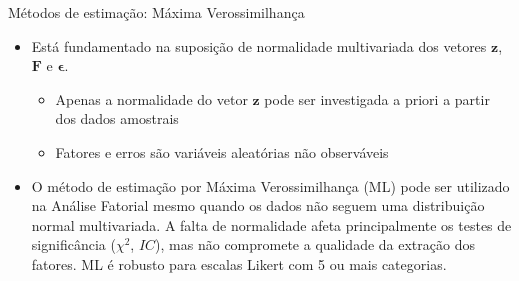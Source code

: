 \documentclass[
  ignorenonframetext,
  aspectratio=169,
]{beamer}
\providecommand{\tightlist}{%
  \setlength{\itemsep}{0pt}\setlength{\parskip}{0pt}}
\begin{document}
\begin{frame}{Métodos de estimação: Máxima Verossimilhança}
\label{muxe9todos-de-estimauxe7uxe3o-muxe1xima-verossimilhanuxe7a-3}
\begin{tcolorbox}[enhanced jigsaw, toprule=.15mm, bottomrule=.15mm, title=\textcolor{quarto-callout-warning-color}{\faExclamationTriangle}\hspace{0.5em}{Cuidado!}, opacityback=0, leftrule=.75mm, bottomtitle=1mm, titlerule=0mm, rightrule=.15mm, coltitle=black, colback=white, colbacktitle=quarto-callout-warning-color!10!white, colframe=quarto-callout-warning-color-frame, toptitle=1mm, arc=.35mm, left=2mm, breakable, opacitybacktitle=0.6]

\begin{itemize}
\tightlist
\item
  Está fundamentado na suposição de normalidade multivariada dos vetores
  \(\boldsymbol{z}\), \(\boldsymbol{F}\) e \(\boldsymbol{\epsilon}\).

  \begin{itemize}
  \tightlist
  \item
    Apenas a normalidade do vetor \(\boldsymbol{z}\) pode ser
    investigada a priori a partir dos dados amostrais
  \item
    Fatores e erros são variáveis aleatórias não observáveis
  \end{itemize}
\end{itemize}

\end{tcolorbox}

\pause

\begin{tcolorbox}[enhanced jigsaw, toprule=.15mm, bottomrule=.15mm, title=\textcolor{quarto-callout-tip-color}{\faLightbulb}\hspace{0.5em}{Observação Importante}, opacityback=0, leftrule=.75mm, bottomtitle=1mm, titlerule=0mm, rightrule=.15mm, coltitle=black, colback=white, colbacktitle=quarto-callout-tip-color!10!white, colframe=quarto-callout-tip-color-frame, toptitle=1mm, arc=.35mm, left=2mm, breakable, opacitybacktitle=0.6]

\begin{itemize}
\tightlist
\item
  O método de estimação por Máxima Verossimilhança (ML) pode ser
  utilizado na Análise Fatorial mesmo quando os dados não seguem uma
  distribuição normal multivariada. A falta de normalidade afeta
  principalmente os testes de significância (\(\chi^2\), \(IC\)), mas
  não compromete a qualidade da extração dos fatores. ML é robusto para
  escalas Likert com 5 ou mais categorias.
\end{itemize}

\end{tcolorbox}
\end{frame}
\end{document}

